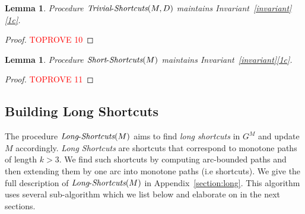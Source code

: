 \documentclass[11pt]{article}
\newtheorem{lemma}[theorem]{Lemma}
\newcommand{\LS}{\mbox{{\it Long}-{\it Shortcuts}}}
\newcommand{\Simple}{\mbox{{\it Short}-{\it Shortcuts}}}
\newcommand{\Trivial}{\mbox{{\it Trivial}-{\it Shortcuts}}}
\begin{document}
\begin{lemma}\label{lemma:trivial-shortcuts-invariant}
    Procedure $\Trivial(M,D)$ maintains Invariant~\ref{invariant}\ref{1c}.
\end{lemma}

\begin{proof}\textcolor{red}{TOPROVE 10}\end{proof}


\begin{lemma}\label{lemma:simple-shortcuts-invariant}
    Procedure $\Simple(M)$ maintains Invariant~\ref{invariant}\ref{1c}.
\end{lemma}

\begin{proof}\textcolor{red}{TOPROVE 11}\end{proof}

\subsection{Building Long Shortcuts}
The procedure $\LS(M)$ aims to find \emph{long shortcuts} in $G^M$ and update $M$ accordingly. \emph{Long Shortcuts} are shortcuts that correspond to monotone paths of length $k>3$. We find such shortcuts by computing arc-bounded paths and then extending them by one arc into monotone paths (i.e  shortcuts). We give the full description of $\LS(M)$ in Appendix~\ref{section:long}. This algorithm uses several sub-algorithm which we list below and elaborate on in the next sections. 
\end{document}
